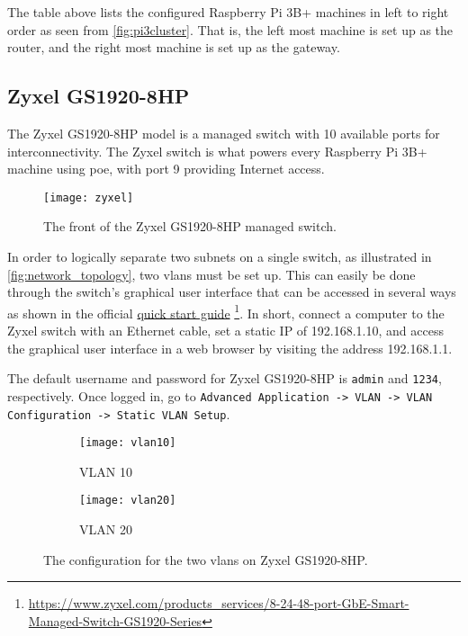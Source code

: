 The table above lists the configured Raspberry Pi 3B+ machines in left to right order as seen from \ref{fig:pi3cluster}. That is, the left most machine is set up as the router, and the right most machine is set up as the gateway.




\subsection{Zyxel GS1920-8HP} \label{zyxel}

The Zyxel GS1920-8HP model is a managed switch with 10 available ports for interconnectivity. The Zyxel switch is what powers every Raspberry Pi 3B+ machine using \gls{poe}, with port 9 providing Internet access.

\begin{figure}[H]
    \centering
    \texttt{[image: zyxel]}
    \captionsetup{width=1.0\linewidth}
    \caption{The front of the Zyxel GS1920-8HP managed switch.}
    \label{fig:zyxel}
\end{figure}

In order to logically separate two subnets on a single switch, as illustrated in \ref{fig:network_topology}, two \gls{vlan}s must be set up. This can easily be done through the switch's graphical user interface that can be accessed in several ways as shown in the official \href{https://www.zyxel.com/support/download_landing/product/gs1920_series_18.shtml?c=gb&l=en&pid=20130521174252&tab=Quick_Start_Guide&pname=GS1920%20Series}{quick start guide} \footnote{\url{https://www.zyxel.com/products_services/8-24-48-port-GbE-Smart-Managed-Switch-GS1920-Series}}. In short, connect a computer to the Zyxel switch with an Ethernet cable, set a static IP of 192.168.1.10, and access the graphical user interface in a web browser by visiting the address 192.168.1.1.

The default username and password for Zyxel GS1920-8HP is \lstinline{admin} and \lstinline{1234}, respectively. Once logged in, go to \lstinline{Advanced Application -> VLAN -> VLAN Configuration -> Static VLAN Setup}.

\begin{figure}[H]
    \centering
    \begin{subfigure}{0.5\linewidth}
        \centering
        \texttt{[image: vlan10]}
        \caption{VLAN 10}
        \label{fig:vlan10}
    \end{subfigure}%
    \begin{subfigure}{0.5\linewidth}
        \centering
        \texttt{[image: vlan20]}
        \caption{VLAN 20}
        \label{fig:vlan20}
    \end{subfigure}
    \caption{The configuration for the two \gls{vlan}s on Zyxel GS1920-8HP.}
    \label{fig:vlans}
\end{figure}


